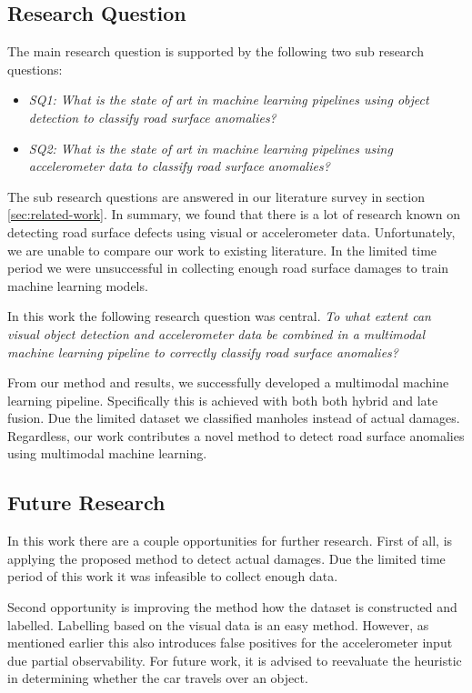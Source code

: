 \subsection{Research Question}

The main research question is supported by the following two sub research questions:

\begin{itemize}
\item \textit{SQ1: What is the state of art in machine learning pipelines using object detection to classify road surface anomalies?}
\item \textit{SQ2: What is the state of art in machine learning pipelines using accelerometer data to classify road surface anomalies?}
\end{itemize}

The sub research questions are answered in our literature survey in section \ref{sec:related-work}. In summary, we found that there is a lot of research known on detecting road surface defects using visual or accelerometer data. Unfortunately, we are unable to compare our work to existing literature. In the limited time period we were unsuccessful in collecting enough road surface damages to train machine learning models.

In this work the following research question was central. \textit{To what extent can visual object detection and accelerometer data be combined in a multimodal machine learning pipeline to correctly classify road surface anomalies?}

From our method and results, we successfully developed a multimodal machine learning pipeline. Specifically this is achieved with both both hybrid and late fusion. Due the limited dataset we classified manholes instead of actual damages. Regardless, our work contributes a novel method to detect road surface anomalies using multimodal machine learning.


\subsection{Future Research}

In this work there are a couple opportunities for further research. First of all, is applying the proposed method to detect actual damages. Due the limited time period of this work it was infeasible to collect enough data.

Second opportunity is improving the method how the dataset is constructed and labelled. Labelling based on the visual data is an easy method. However, as mentioned earlier this also introduces false positives for the accelerometer input due partial observability. For future work, it is advised to reevaluate the heuristic in determining whether the car travels over an object.

